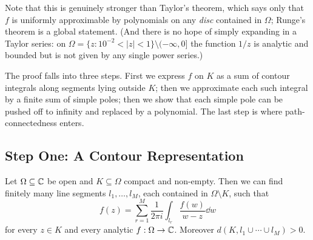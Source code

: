 \documentclass[a4paper]{scrartcl}
\begin{document}
Note that this is genuinely stronger than Taylor's theorem, which says only that $f$ is uniformly approximable by polynomials on any \emph{disc} contained in $\Omega$; Runge's theorem is a global statement. (And there is no hope of simply expanding in a Taylor series: on $\Omega = \{z : 10^{-2}<|z|<1\}\setminus(-\infty,0]$ the function $1/z$ is analytic and bounded but is not given by any single power series.)

The proof falls into three steps. First we express $f$ on $K$ as a sum of contour integrals along segments lying outside $K$; then we approximate each such integral by a finite sum of simple poles; then we show that each simple pole can be pushed off to infinity and replaced by a polynomial. The last step is where path-connectedness enters.

\subsection{Step One: A Contour Representation}

\begin{lemma}\label{lem:runge-contours}
	Let $\Omega\subseteq\mathbb{C}$ be open and $K\subseteq\Omega$ compact and non-empty. Then we can find finitely many line segments $l_1,\ldots,l_M$, each contained in $\Omega\setminus K$, such that
	$$f(z) = \sum_{r=1}^M\frac{1}{2\pi i}\int_{l_r}\frac{f(w)}{w-z}\dd w$$
	for every $z\in K$ and every analytic $f : \Omega\to\mathbb{C}$. Moreover $d(K, l_1\cup\cdots\cup l_M) > 0$.
\end{lemma}
\end{document}
